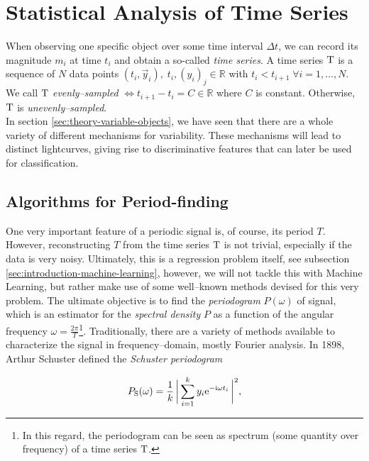 \section{Statistical Analysis of Time Series}

When observing one specific object over some time interval $\Delta t$, we can record its magnitude $m_i$ at time $t_i$ and obtain a so-called \emph{time series}. A time series $\mathrm{T}$ is a sequence of $N$ data points $(t_i, \vec y_i),\; t_i,(y_i)_j \in \mathbb{R}$ with $t_i < t_{i+1} \; \forall i = 1,\ldots,N$. We call $\mathrm{T}$ \emph{evenly--sampled} $\Leftrightarrow t_{i+1} - t_i = C \in \mathbb{R}$ where $C$ is constant. Otherwise, $\mathrm{T}$ is \emph{unevenly--sampled}.\\

In section \ref{sec:theory-variable-objects}, we have seen that there are a whole variety of different mechanisms for variability. These mechanisms will lead to distinct lightcurves, giving rise to discriminative features that can later be used for classification.

\subsection{Algorithms for Period-finding}

One very important feature of a periodic signal is, of course, its period $T$. However, reconstructing $T$ from the time series $\mathrm{T}$ is not trivial, especially if the data is very noisy. Ultimately, this is a regression problem itself, see subsection \ref{sec:introduction-machine-learning}, however, we will not tackle this with Machine Learning, but rather make use of some well--known methods devised for this very problem. The ultimate objective is to find the \emph{periodogram} $P(\omega)$ of signal, which is an estimator for the \emph{spectral density} $P$ as a function of the angular frequency $\omega = \frac{2 \pi}{T}$\footnote{In this regard, the periodogram can be seen as spectrum (some quantity over frequency) of a time series $\mathrm{T}$.}. Traditionally, there are a variety of methods available to characterize the signal in frequency--domain, mostly Fourier analysis. In 1898, Arthur Schuster defined the \emph{Schuster periodogram}

\begin{equation}
\label{eg:schuster-periodogram}
P_{\text{S}}(\omega) = \frac{1}{k} \, \biggl| \, \sum\limits_{i=1}^{k} y_i \mathrm{e}^{-\mathrm{i} \omega t_i} \, \biggr|^2,
\end{equation}

